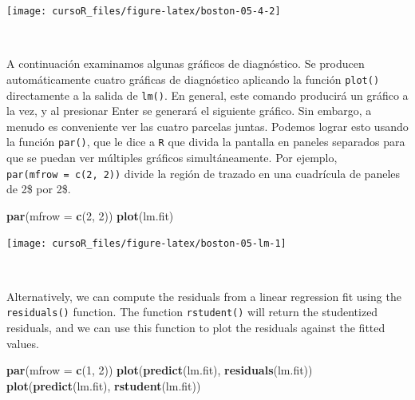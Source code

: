 \documentclass[]{book}
\newenvironment{Shaded}{\begin{snugshade}}{\end{snugshade}}
\newcommand{\KeywordTok}[1]{\textcolor[rgb]{0.13,0.29,0.53}{\textbf{#1}}}
\newcommand{\DataTypeTok}[1]{\textcolor[rgb]{0.13,0.29,0.53}{#1}}
\newcommand{\DecValTok}[1]{\textcolor[rgb]{0.00,0.00,0.81}{#1}}
\newcommand{\NormalTok}[1]{#1}
\begin{document}
\begin{center}\texttt{[image: cursoR\_files/figure-latex/boston-05-4-2]} \end{center}

~

A continuación examinamos algunas gráficos de diagnóstico. Se producen
automáticamente cuatro gráficas de diagnóstico aplicando la función
\texttt{plot()} directamente a la salida de \texttt{lm()}. En general,
este comando producirá un gráfico a la vez, y al presionar Enter se
generará el siguiente gráfico. Sin embargo, a menudo es conveniente ver
las cuatro parcelas juntas. Podemos lograr esto usando la función
\texttt{par()}, que le dice a \texttt{R} que divida la pantalla en
paneles separados para que se puedan ver múltiples gráficos
simultáneamente. Por ejemplo, \texttt{par(mfrow\ =\ c(2,\ 2))} divide la
región de trazado en una cuadrícula de paneles de 2\$ por 2\$.

\begin{Shaded}
\begin{Highlighting}[]
\KeywordTok{par}\NormalTok{(}\DataTypeTok{mfrow =} \KeywordTok{c}\NormalTok{(}\DecValTok{2}\NormalTok{, }\DecValTok{2}\NormalTok{))}
\KeywordTok{plot}\NormalTok{(lm.fit)}
\end{Highlighting}
\end{Shaded}

\begin{center}\texttt{[image: cursoR\_files/figure-latex/boston-05-lm-1]} \end{center}

~

Alternatively, we can compute the residuals from a linear regression fit
using the \texttt{residuals()} function. The function
\texttt{rstudent()} will return the studentized residuals, and we can
use this function to plot the residuals against the fitted values.

\begin{Shaded}
\begin{Highlighting}[]
\KeywordTok{par}\NormalTok{(}\DataTypeTok{mfrow =} \KeywordTok{c}\NormalTok{(}\DecValTok{1}\NormalTok{, }\DecValTok{2}\NormalTok{))}
\KeywordTok{plot}\NormalTok{(}\KeywordTok{predict}\NormalTok{(lm.fit), }\KeywordTok{residuals}\NormalTok{(lm.fit))}
\KeywordTok{plot}\NormalTok{(}\KeywordTok{predict}\NormalTok{(lm.fit), }\KeywordTok{rstudent}\NormalTok{(lm.fit))}
\end{Highlighting}
\end{Shaded}
\end{document}

